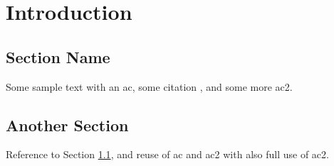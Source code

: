 \chapter{Introduction}
\label{chap:intro}

\section{Section Name} \label{sec:s1}
Some sample text with an \ac{ac}, some citation \cite{citeKey1}, and some more \ac{ac2}.

\section{Another Section}
Reference to Section \ref{sec:s1}, and reuse of \ac{ac} and \ac{ac2} with also full use of \acf{ac2}.
